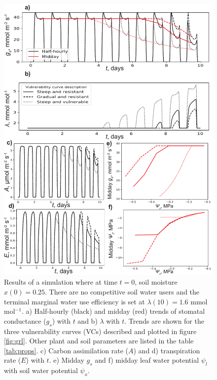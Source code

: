\documentclass[utf8]{frontiersSCNS} %
\begin{document}
\begin{figure}[h]
    \begin{center}
         \includegraphics[scale=0.65]{WUS_no_comp.pdf} 
    \end{center}
    \caption{Results of a simulation where at time $t=0$, soil moisture $x(0) =0.25$. There are no competitive soil water users and the terminal marginal water use efficiency is set at $\lambda(10) = 1.6$ mmol mol$^{-1}$. a) Half-hourly (black) and midday (red) trends of stomatal conductance ($g_s$) with $t$ and b) $\lambda$ with $t$. Trends are shown for the three vulnerability curves (VCs) described and plotted in figure \ref{fig:grl}. Other plant and soil parameters are listed in the table \ref{tab:props}. c) Carbon assimilation rate ($A$) and d) transpiration rate ($E$) with $t$. e) Midday $g_s$ and f) midday leaf water potential $\psi_l$ with soil water potential $\psi_x$.}
    \label{fig:WUS_no_comp}
\end{figure}
\end{document}

